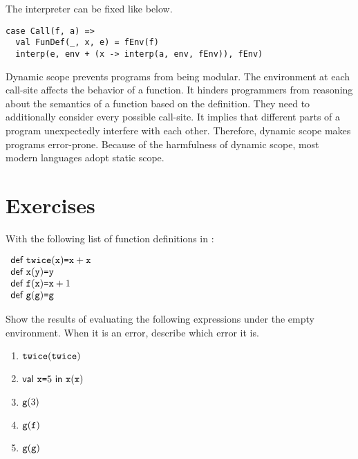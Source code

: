 The interpreter can be fixed like below.

\begin{verbatim}
case Call(f, a) =>
  val FunDef(_, x, e) = fEnv(f)
  interp(e, env + (x -> interp(a, env, fEnv)), fEnv)
\end{verbatim}

Dynamic scope prevents programs from being modular. The environment at each call-site
affects the behavior of a function. It hinders programmers from reasoning about
the semantics of a function based on the definition. They need to additionally consider
every possible call-site. It implies that different parts of a program unexpectedly
interfere with each other. Therefore, dynamic scope makes programs error-prone.
Because of the harmfulness of dynamic scope, most modern languages adopt static
scope.

\section{Exercises}

\begin{exercise}

With the following list of function definitions in \lang:

$
\begin{array}{l}
  \textsf{def}\ \texttt{twice}(\texttt{x})\texttt{=}\texttt{x}+\texttt{x} \\
  \textsf{def}\ \texttt{x}(\texttt{y})\texttt{=}\texttt{y} \\
  \textsf{def}\ \texttt{f}(\texttt{x})\texttt{=}\texttt{x}+1 \\
  \textsf{def}\ \texttt{g}(\texttt{g})\texttt{=}\texttt{g} \\
\end{array}
$

Show the results of evaluating the following expressions under the empty environment.
When it is an error, describe which error it is.
\begin{enumerate}
  \item $\texttt{twice}(\texttt{twice})$
  \item $\textsf{val}\ \texttt{x}\texttt{=}5\ \textsf{in}\ \texttt{x}(\texttt{x})$
  \item $\texttt{g}(3)$
  \item $\texttt{g}(\texttt{f})$
  \item $\texttt{g}(\texttt{g})$
\end{enumerate}

\end{exercise}
